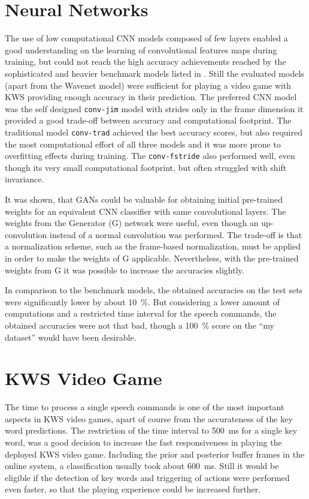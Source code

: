 \section{Neural Networks}
\thesisStateReady
The use of low computational CNN models composed of few layers enabled a good understanding on the learning of convolutional features maps during training, but could not reach the high accuracy achievements reached by the sophisticated and heavier benchmark models listed in . 
Still the evaluated models (apart from the Wavenet model) were sufficient for playing a video game with KWS providing enough accuracy in their prediction.
The preferred CNN model was the self designed \texttt{conv-jim} model with strides only in the frame dimension it provided a good trade-off between accuracy and computational footprint.
The traditional model \texttt{conv-trad} achieved the best accuracy scores, but also required the most computational effort of all three models and it was more prone to overfitting effects during training.
The \texttt{conv-fstride} also performed well, even though its very small computational footprint, but often struggled with shift invariance.

It was shown, that GANs could be valuable for obtaining initial pre-trained weights for an equivalent CNN classifier with same convolutional layers.
The weights from the Generator (G) network were useful, even though an up-convolution instead of a normal convolution was performed.
The trade-off is that a normalization scheme, such as the frame-based normalization, must be applied in order to make the weights of G applicable.
Nevertheless, with the pre-trained weights from G it was possible to increase the accuracies slightly.

In comparison to the benchmark models, the obtained accuracies on the test sets were significantly lower by about \SI{10}{\percent}.
But considering a lower amount of computations and a restricted time interval for the speech commands, the obtained accuracies were not that bad, though a \SI{100}{\percent} score on the \enquote{my dataset} would have been desirable.



\section{KWS Video Game}
\thesisStateReady
The time to process a single speech commands is one of the most important aspects in KWS video games, apart of course from the accurateness of the key word predictions.
The restriction of the time interval to \SI{500}{\milli\second} for a single key word, was a good decision to increase the fast responsiveness in playing the deployed KWS video game.
Including the prior and posterior buffer frames in the online system, a classification usually took about \SI{600}{\milli\second}.
Still it would be eligible if the detection of key words and triggering of actions were performed even faster, so that the playing experience could be increased further.

